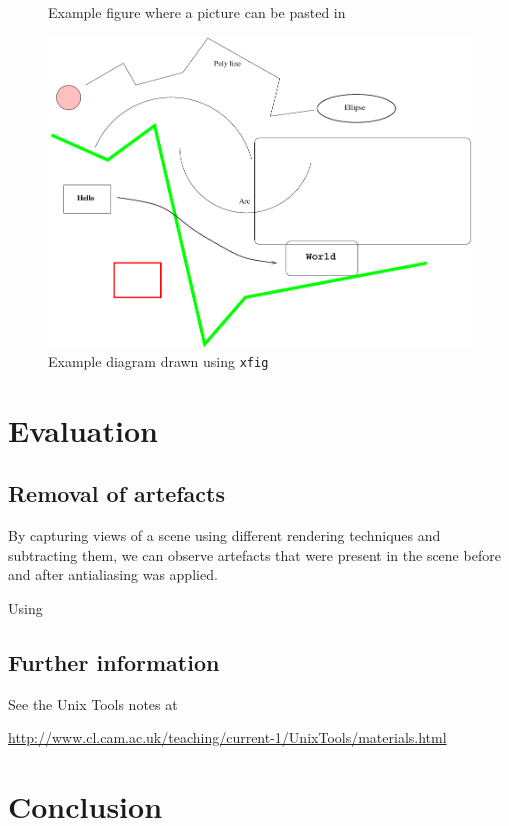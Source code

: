 \documentclass[12pt,a4paper,twoside,openright]{report}
\begin{document}
\begin{figure}[tbh]
\vspace{4in}
\caption{Example figure where a picture can be pasted in}
\label{pastedfig}
\end{figure}


\begin{figure}[tbh]
\centerline{\includegraphics{figs/diagram.pdf}}
\caption{Example diagram drawn using \texttt{xfig}}
\label{xfig}
\end{figure}


\chapter{Evaluation}

\section{Removal of artefacts}
By capturing views of a scene using different rendering techniques and subtracting them, we can observe artefacts that were present in the scene before and after antialiasing was applied.

Using 

\section{Further information}

See the Unix Tools notes at

\url{http://www.cl.cam.ac.uk/teaching/current-1/UnixTools/materials.html}


\chapter{Conclusion}
\end{document}
